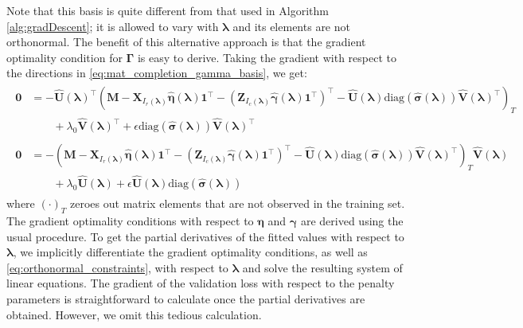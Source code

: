 \documentclass[12pt,letterpaper]{article}
\begin{document}
Note that this basis is quite different from that used in Algorithm \ref{alg:gradDescent}; it is allowed to vary with $\boldsymbol{\lambda}$ and its elements are not orthonormal. The benefit of this alternative approach is that the gradient optimality condition for $\boldsymbol{\Gamma}$ is easy to derive. Taking the gradient with respect to the directions in \ref{eq:mat_completion_gamma_basis}, we get:
\begin{align}
\begin{split}
\boldsymbol{0} & = 
- \hat{\boldsymbol{U}}(\boldsymbol{\lambda})^\top
\left (
\boldsymbol{M} 
- \boldsymbol{X}_{I_r(\boldsymbol{\lambda})} \hat{\boldsymbol{\eta}}(\boldsymbol{\lambda}) \boldsymbol{1}^\top 
- (\boldsymbol{Z}_{I_c(\boldsymbol{\lambda})} \hat{\boldsymbol{\gamma}}(\boldsymbol{\lambda})  \boldsymbol{1}^\top )^\top
- \hat{\boldsymbol{U}}(\boldsymbol{\lambda})\text{diag}(\hat{\boldsymbol{\sigma}}(\boldsymbol{\lambda})) \hat{\boldsymbol{V}}(\boldsymbol{\lambda})^\top
\right )_T
\\
& \qquad + \lambda_0 \hat{\boldsymbol{V}}(\boldsymbol{\lambda})^\top
+ \epsilon \text{diag}(\hat{\boldsymbol{\sigma}}(\boldsymbol{\lambda})) \hat{\boldsymbol{V}}(\boldsymbol{\lambda})^\top
\end{split}
\label{eq:grad_opt_matrix_left}
\\
\begin{split}
\boldsymbol{0} & = -\left (
\boldsymbol{M} 
- \boldsymbol{X}_{I_r(\boldsymbol{\lambda})} \hat{\boldsymbol{\eta}}(\boldsymbol{\lambda}) \boldsymbol{1}^\top 
- (\boldsymbol{Z}_{I_c(\boldsymbol{\lambda})} \hat{\boldsymbol{\gamma}}(\boldsymbol{\lambda})  \boldsymbol{1}^\top )^\top
- \hat{\boldsymbol{U}}(\boldsymbol{\lambda})\text{diag}(\hat{\boldsymbol{\sigma}}(\boldsymbol{\lambda})) \hat{\boldsymbol{V}}(\boldsymbol{\lambda})^\top
\right )_T
\hat{\boldsymbol{V}}(\boldsymbol{\lambda})
\\
& \qquad + \lambda_0 \hat{\boldsymbol{U}}(\boldsymbol{\lambda})
+ \epsilon \hat{\boldsymbol{U}}(\boldsymbol{\lambda}) \text{diag}(\hat{\boldsymbol{\sigma}}(\boldsymbol{\lambda}))
\end{split}
\label{eq:grad_opt_matrix_comp}
\end{align}
where $(\cdot)_T$ zeroes out matrix elements that are not observed in the training set. The gradient optimality conditions with respect to $\boldsymbol{\eta}$ and $\boldsymbol{\gamma}$ are derived using the usual procedure. To get the partial derivatives of the fitted values with respect to $\boldsymbol{\lambda}$, we implicitly differentiate the gradient optimality conditions, as well as \eqref{eq:orthonormal_constraints}, with respect to $\boldsymbol{\lambda}$ and solve the resulting system of linear equations. The gradient of the validation loss with respect to the penalty parameters is straightforward to calculate once the partial derivatives are obtained. However, we omit this tedious calculation.
\end{document}
